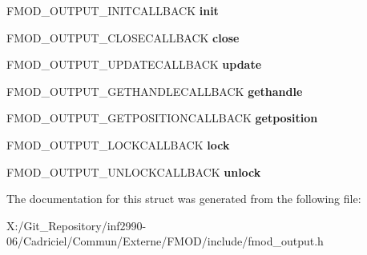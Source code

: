 \begin{DoxyCompactItemize}
\item 
\hypertarget{struct_f_m_o_d___o_u_t_p_u_t___d_e_s_c_r_i_p_t_i_o_n_a16015d5d334e75322b95adebaac20139}{F\-M\-O\-D\-\_\-\-O\-U\-T\-P\-U\-T\-\_\-\-I\-N\-I\-T\-C\-A\-L\-L\-B\-A\-C\-K {\bfseries init}}\label{struct_f_m_o_d___o_u_t_p_u_t___d_e_s_c_r_i_p_t_i_o_n_a16015d5d334e75322b95adebaac20139}

\item 
\hypertarget{struct_f_m_o_d___o_u_t_p_u_t___d_e_s_c_r_i_p_t_i_o_n_a5e0e9b99b7b8011bb248e58ad82b4fa8}{F\-M\-O\-D\-\_\-\-O\-U\-T\-P\-U\-T\-\_\-\-C\-L\-O\-S\-E\-C\-A\-L\-L\-B\-A\-C\-K {\bfseries close}}\label{struct_f_m_o_d___o_u_t_p_u_t___d_e_s_c_r_i_p_t_i_o_n_a5e0e9b99b7b8011bb248e58ad82b4fa8}

\item 
\hypertarget{struct_f_m_o_d___o_u_t_p_u_t___d_e_s_c_r_i_p_t_i_o_n_a3c61df7f0da61edd058317a0966c04bf}{F\-M\-O\-D\-\_\-\-O\-U\-T\-P\-U\-T\-\_\-\-U\-P\-D\-A\-T\-E\-C\-A\-L\-L\-B\-A\-C\-K {\bfseries update}}\label{struct_f_m_o_d___o_u_t_p_u_t___d_e_s_c_r_i_p_t_i_o_n_a3c61df7f0da61edd058317a0966c04bf}

\item 
\hypertarget{struct_f_m_o_d___o_u_t_p_u_t___d_e_s_c_r_i_p_t_i_o_n_a2029938a3daf763ac99e971bf0a4ce40}{F\-M\-O\-D\-\_\-\-O\-U\-T\-P\-U\-T\-\_\-\-G\-E\-T\-H\-A\-N\-D\-L\-E\-C\-A\-L\-L\-B\-A\-C\-K {\bfseries gethandle}}\label{struct_f_m_o_d___o_u_t_p_u_t___d_e_s_c_r_i_p_t_i_o_n_a2029938a3daf763ac99e971bf0a4ce40}

\item 
\hypertarget{struct_f_m_o_d___o_u_t_p_u_t___d_e_s_c_r_i_p_t_i_o_n_ae8b8332e832ea9d12c45a48dd0481e9e}{F\-M\-O\-D\-\_\-\-O\-U\-T\-P\-U\-T\-\_\-\-G\-E\-T\-P\-O\-S\-I\-T\-I\-O\-N\-C\-A\-L\-L\-B\-A\-C\-K {\bfseries getposition}}\label{struct_f_m_o_d___o_u_t_p_u_t___d_e_s_c_r_i_p_t_i_o_n_ae8b8332e832ea9d12c45a48dd0481e9e}

\item 
\hypertarget{struct_f_m_o_d___o_u_t_p_u_t___d_e_s_c_r_i_p_t_i_o_n_a906c1cdb6636db105538db27b48cc513}{F\-M\-O\-D\-\_\-\-O\-U\-T\-P\-U\-T\-\_\-\-L\-O\-C\-K\-C\-A\-L\-L\-B\-A\-C\-K {\bfseries lock}}\label{struct_f_m_o_d___o_u_t_p_u_t___d_e_s_c_r_i_p_t_i_o_n_a906c1cdb6636db105538db27b48cc513}

\item 
\hypertarget{struct_f_m_o_d___o_u_t_p_u_t___d_e_s_c_r_i_p_t_i_o_n_adeb7eea407c7b5b167d0cd30c6ef4a9f}{F\-M\-O\-D\-\_\-\-O\-U\-T\-P\-U\-T\-\_\-\-U\-N\-L\-O\-C\-K\-C\-A\-L\-L\-B\-A\-C\-K {\bfseries unlock}}\label{struct_f_m_o_d___o_u_t_p_u_t___d_e_s_c_r_i_p_t_i_o_n_adeb7eea407c7b5b167d0cd30c6ef4a9f}

\end{DoxyCompactItemize}


The documentation for this struct was generated from the following file\-:\begin{DoxyCompactItemize}
\item 
X\-:/\-Git\-\_\-\-Repository/inf2990-\/06/\-Cadriciel/\-Commun/\-Externe/\-F\-M\-O\-D/include/fmod\-\_\-output.\-h\end{DoxyCompactItemize}
